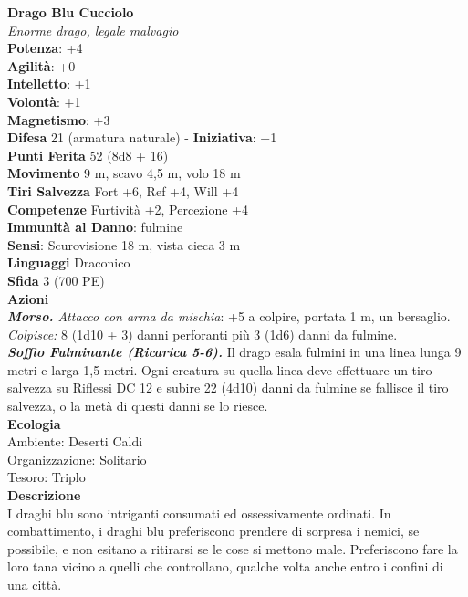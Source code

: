 \begin{multicols}{2}
\medskip\textbf{Drago Blu Cucciolo}\\
\emph{Enorme drago, legale malvagio}\\
\textbf{Potenza}: +4\\
\textbf{Agilità}: +0\\
\textbf{Intelletto}: +1\\
\textbf{Volontà}: +1\\
\textbf{Magnetismo}: +3\\
\textbf{Difesa} 21 (armatura naturale) - \textbf{Iniziativa}: +1\\
\textbf{Punti Ferita} 52 (8d8 + 16)\\
\textbf{Movimento} 9 m, scavo 4,5 m, volo 18 m\\
\textbf{Tiri Salvezza} Fort +6, Ref +4, Will +4\\
\textbf{Competenze} Furtività +2, Percezione +4\\
\textbf{Immunità al Danno}: fulmine\\
\textbf{Sensi}: Scurovisione 18 m, vista cieca 3 m\\
\textbf{Linguaggi} Draconico\\
\textbf{Sfida} 3 (700 PE)\smallskip\\
\smallskip\textbf{Azioni}\\
\emph{\textbf{Morso.} Attacco con arma da mischia}: +5 a colpire, portata 1 m, un bersaglio.\\
\emph{Colpisce:} 8 (1d10 + 3) danni perforanti più 3 (1d6) danni da fulmine.\\
\emph{\textbf{Soffio Fulminante (Ricarica 5-6).}} Il drago esala fulmini in una linea lunga 9 metri e larga 1,5 metri. Ogni creatura su quella linea deve effettuare un tiro salvezza su Riflessi DC 12 e subire 22 (4d10) danni da fulmine se fallisce il tiro salvezza, o la metà di questi danni se lo riesce.\\
\textbf{Ecologia}\\
Ambiente: Deserti Caldi\\
Organizzazione: Solitario\\
Tesoro: Triplo\\
\textbf{Descrizione}\\
I draghi blu sono intriganti consumati ed ossessivamente ordinati. In combattimento, i draghi blu preferiscono prendere di sorpresa i nemici, se possibile, e non esitano a ritirarsi se le cose si mettono male. Preferiscono fare la loro tana vicino a quelli che controllano, qualche volta anche entro i confini di una città.\\



\end{multicols}
